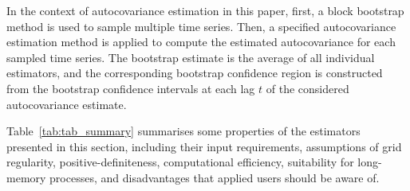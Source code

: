 In the context of autocovariance estimation in this paper, first, a block bootstrap method is used to sample multiple time series. Then, a specified autocovariance estimation method is applied to compute the estimated autocovariance for each sampled time series. The bootstrap estimate is the average of all individual estimators, and the corresponding bootstrap confidence region is constructed from the bootstrap confidence intervals at each lag $t$ of the considered autocovariance estimate. 

Table~\ref{tab:tab_summary} summarises some properties of the estimators presented in this section, including their input requirements, assumptions of grid regularity, positive-definiteness, computational efficiency, suitability for long-memory processes, and disadvantages that applied users should be aware of.

